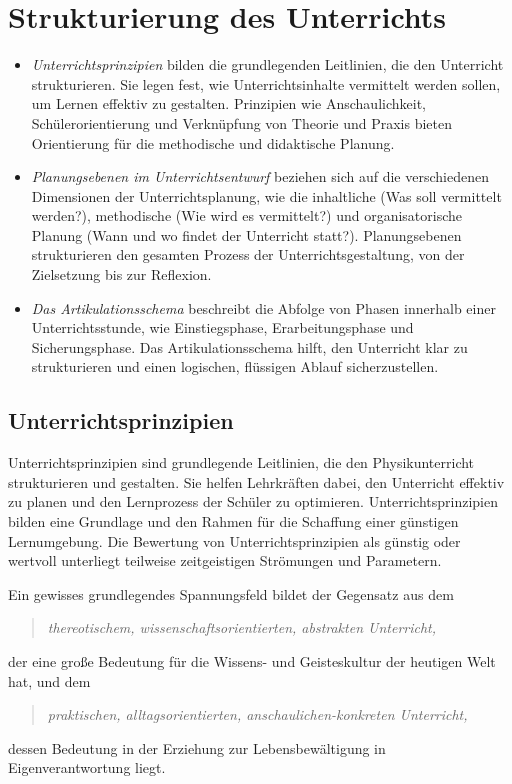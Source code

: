 \chapter{Strukturierung des Unterrichts}\label{Unterricht}


\begin{itemize}
\item
\emph{Unterrichtsprinzipien} bilden die grundlegenden Leitlinien, die den Unterricht strukturieren. Sie legen fest, wie Unterrichtsinhalte vermittelt werden sollen, um Lernen effektiv zu gestalten. Prinzipien wie Anschaulichkeit, Sch\"{u}lerorientierung und Verkn\"{u}pfung von Theorie und Praxis bieten Orientierung f\"{u}r die methodische und didaktische Planung. 
\item
\emph{Planungsebenen im Unterrichtsentwurf} beziehen sich auf die verschiedenen Dimensionen der Unterrichtsplanung, wie die inhaltliche (Was soll vermittelt werden?), methodische (Wie wird es vermittelt?) und organisatorische Planung (Wann und wo findet der Unterricht statt?). Planungsebenen strukturieren den gesamten Prozess der Unterrichtsgestaltung, von der Zielsetzung bis zur Reflexion.
\item
\emph{Das Artikulationsschema} beschreibt die Abfolge von Phasen innerhalb einer Unterrichtsstunde, wie Einstiegsphase, Erarbeitungsphase und Sicherungsphase. Das Artikulationsschema hilft, den Unterricht klar zu strukturieren und einen logischen, fl\"{u}ssigen Ablauf sicherzustellen.
\end{itemize}

\bip\bip
\section{Unterrichtsprinzipien}
Unterrichtsprinzipien sind grundlegende Leitlinien, die den Physikunterricht strukturieren und gestalten. Sie helfen Lehrkr\"{a}ften dabei, den Unterricht effektiv zu planen und den Lernprozess der Sch\"{u}ler zu optimieren. Unterrichtsprinzipien bilden eine Grundlage und den Rahmen f\"{u}r die Schaffung einer g\"{u}nstigen Lernumgebung. 
Die Bewertung von Unterrichtsprinzipien als g\"{u}nstig oder wertvoll unterliegt teilweise zeitgeistigen Str\"{o}mungen und Parametern.

Ein gewisses grundlegendes Spannungsfeld bildet der Gegensatz aus dem
\begin{quote}
\emph{thereotischem, wissenschaftsorientierten, abstrakten Unterricht,}
\end{quote}
der eine gro{\ss}e Bedeutung f\"{u}r die Wissens- und Geisteskultur der
heutigen Welt hat,
und dem
\begin{quote}
\emph{praktischen, alltagsorientierten,
anschaulichen-konkreten Unterricht,}
\end{quote}
dessen Bedeutung in der Erziehung zur Lebensbew\"{a}ltigung in
Eigenverantwortung liegt.

